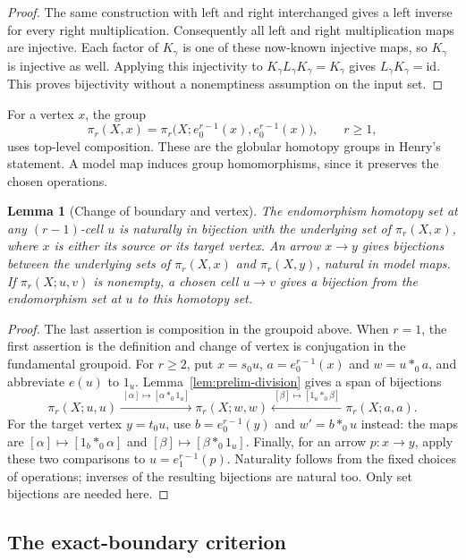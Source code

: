 \documentclass[11pt,letterpaper]{article}
\numberwithin{equation}{section}
\theoremstyle{plain}
\newtheorem{lemma}[theorem]{Lemma}
\theoremstyle{definition}
\theoremstyle{remark}
\newcommand{\id}{\mathrm{id}}
\begin{document}
\begin{proof}
The same construction with left and right interchanged gives a
left inverse for every right multiplication.  Consequently all
left and right multiplication maps are injective.  Each factor
of $K_\gamma$ is one of these now-known injective maps, so
$K_\gamma$ is injective as well.  Applying this injectivity to
$K_\gamma L_\gamma K_\gamma=K_\gamma$ gives
$L_\gamma K_\gamma=\id$.  This proves bijectivity without a
nonemptiness assumption on the input set.
\end{proof}

For a vertex $x$, the group
\[
 \pi_r(X,x)=
 \pi_r\bigl(X;e_0^{r-1}(x),e_0^{r-1}(x)\bigr),\qquad r\ge1,
\]
uses top-level composition.  These are the globular homotopy groups
in Henry's statement.  A model map induces group homomorphisms,
since it preserves the chosen operations.

\begin{lemma}[Change of boundary and vertex]\label{lem:prelim-boundary-change}
The endomorphism homotopy set at any $(r-1)$-cell $u$ is naturally
in bijection with the underlying set of $\pi_r(X,x)$, where $x$
is either its source or its target vertex.  An arrow $x\to y$
gives bijections between the underlying sets of $\pi_r(X,x)$
and $\pi_r(X,y)$, natural in model maps.  If
$\pi_r(X;u,v)$ is nonempty, a chosen cell $u\to v$ gives a
bijection from the endomorphism set at $u$ to this homotopy set.
\end{lemma}

\begin{proof}
The last assertion is composition in the groupoid above.  When
$r=1$, the first assertion is the definition and change of
vertex is conjugation in the fundamental groupoid.  For $r\ge2$,
put $x=s_0u$, $a=e_0^{r-1}(x)$ and $w=u*_0a$, and abbreviate
$e(u)$ to $1_u$.  Lemma~\ref{lem:prelim-division} gives a span
of bijections
\[
 \pi_r(X;u,u)
 \xrightarrow{\ [\alpha]\mapsto[\alpha*_0 1_a]\ }
 \pi_r(X;w,w)
 \xleftarrow{\ [\beta]\mapsto[1_u*_0\beta]\ }
 \pi_r(X;a,a).
\]
For the target vertex $y=t_0u$, use
$b=e_0^{r-1}(y)$ and $w'=b*_0u$ instead: the maps are
$[\alpha]\mapsto[1_b*_0\alpha]$ and
$[\beta]\mapsto[\beta*_0 1_u]$.  Finally, for an arrow
$p:x\to y$, apply these two comparisons to
$u=e_1^{r-1}(p)$.  Naturality follows from the fixed choices of
operations; inverses of the resulting bijections are natural too.
Only set bijections are needed here.
\end{proof}

\subsection{The exact-boundary criterion}
\end{document}
